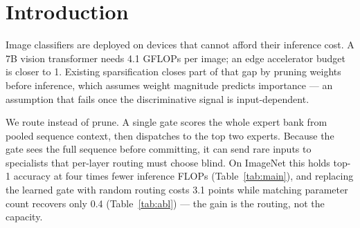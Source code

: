 \documentclass{article}
\begin{document}
\section{Introduction}
Image classifiers are deployed on devices that cannot afford their inference cost.
A 7B vision transformer needs 4.1 GFLOPs per image; an edge accelerator budget is
closer to 1. Existing sparsification closes part of that gap by pruning weights
before inference, which assumes weight magnitude predicts importance --- an
assumption that fails once the discriminative signal is input-dependent.

We route instead of prune. A single gate scores the whole expert bank from pooled
sequence context, then dispatches to the top two experts. Because the gate sees the
full sequence before committing, it can send rare inputs to specialists that
per-layer routing must choose blind. On ImageNet this holds top-1 accuracy at four
times fewer inference FLOPs (Table~\ref{tab:main}), and replacing the learned gate
with random routing costs 3.1 points while matching parameter count recovers only
0.4 (Table~\ref{tab:abl}) --- the gain is the routing, not the capacity.
\end{document}
